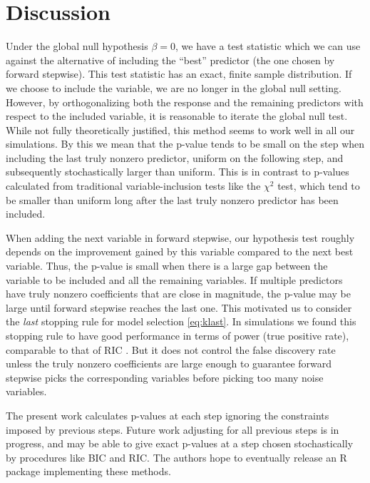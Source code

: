 \documentclass{imsart}
\begin{document}




\section{Discussion}
\label{sec:discuss}

Under the global null hypothesis $\beta = 0$, we have a test statistic
which we can use against the alternative of including the ``best''
predictor (the one chosen by forward stepwise).
This test statistic has an exact, finite sample distribution.
If we choose to include the variable, we are no longer in the global null
setting. However, by orthogonalizing both the response and the remaining
predictors with respect to the included variable, it is reasonable to
iterate the global null test. While not fully theoretically justified,
this method seems to work well in all our simulations. By this we mean that
the p-value tends to be small on the step when including the last truly
nonzero predictor, uniform on the following step, and subsequently
stochastically larger than uniform. This is in contrast to p-values
calculated from traditional variable-inclusion tests like the $\chi^2$
test, which tend to be smaller than uniform long after the last truly
nonzero predictor has been included.

When adding the next variable in forward stepwise, our hypothesis test
roughly depends on the improvement gained by this variable compared to
the next best variable. Thus, the p-value is small when there is a large
gap between the variable to be included and all the remaining variables.
If multiple predictors have truly nonzero coefficients that are close
in magnitude, the p-value may be large until forward stepwise reaches
the last one. This motivated us to consider the \textit{last} stopping
rule for model selection \eqref{eq:klast}. In simulations we
found this stopping rule to have good performance in terms of power
(true positive rate), comparable to that of RIC \citep{RIC}.
But it does not control the false discovery rate
unless the truly nonzero coefficients are large enough to guarantee
forward stepwise picks the corresponding variables before picking too
many noise variables.

The present work calculates p-values at each step ignoring the constraints
imposed by previous steps. Future work adjusting for all previous steps
is in progress, and may be able to give exact p-values at a step chosen
stochastically by procedures like BIC and RIC. The authors hope to
eventually release an R package implementing these methods.
\end{document}
